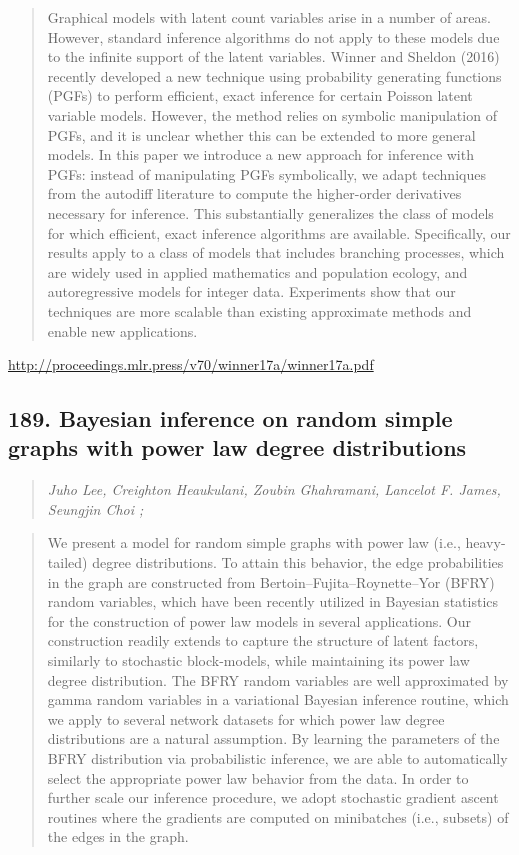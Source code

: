 \documentclass{article}
\begin{document}
\begin{quote}
    Graphical models with latent count variables arise in a number of areas. However, standard inference algorithms do not apply to these models due to the infinite support of the latent variables. Winner and Sheldon (2016) recently developed a new technique using probability generating functions (PGFs) to perform efficient, exact inference for certain Poisson latent variable models. However, the method relies on symbolic manipulation of PGFs, and it is unclear whether this can be extended to more general models. In this paper we introduce a new approach for inference with PGFs: instead of manipulating PGFs symbolically, we adapt techniques from the autodiff literature to compute the higher-order derivatives necessary for inference. This substantially generalizes the class of models for which efficient, exact inference algorithms are available. Specifically, our results apply to a class of models that includes branching processes, which are widely used in applied mathematics and population ecology, and autoregressive models for integer data. Experiments show that our techniques are more scalable than existing approximate methods and enable new applications.  
\end{quote}

\href{http://proceedings.mlr.press/v70/winner17a/winner17a.pdf}{http://proceedings.mlr.press/v70/winner17a/winner17a.pdf}

\subsection{189. Bayesian inference on random simple graphs with power law degree distributions}

\begin{quote}
\footnotesize{\textit{Juho Lee, Creighton Heaukulani, Zoubin Ghahramani, Lancelot F. James, Seungjin Choi ;}}

\end{quote}

\begin{quote}
    We present a model for random simple graphs with power law (i.e., heavy-tailed) degree distributions. To attain this behavior, the edge probabilities in the graph are constructed from Bertoin–Fujita–Roynette–Yor (BFRY) random variables, which have been recently utilized in Bayesian statistics for the construction of power law models in several applications. Our construction readily extends to capture the structure of latent factors, similarly to stochastic block-models, while maintaining its power law degree distribution. The BFRY random variables are well approximated by gamma random variables in a variational Bayesian inference routine, which we apply to several network datasets for which power law degree distributions are a natural assumption. By learning the parameters of the BFRY distribution via probabilistic inference, we are able to automatically select the appropriate power law behavior from the data. In order to further scale our inference procedure, we adopt stochastic gradient ascent routines where the gradients are computed on minibatches (i.e., subsets) of the edges in the graph.  
\end{quote}
\end{document}
